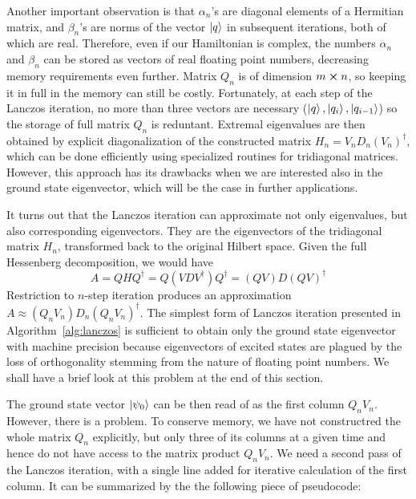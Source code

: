 Another important observation is that \(\alpha_n\)'s are diagonal elements of a Hermitian matrix, and \(\beta_n\)'s are
norms of the vector \(\ket{q}\) in subsequent iterations, both of which are real. Therefore, even if our Hamiltonian is
complex, the numbers \(\alpha_n\) and \(\beta_n\) can be stored as vectors of real floating point numbers, decreasing
memory requirements even further.
Matrix \(Q_n\) is of dimension \(m \cross n\), so keeping it in full in the memory can still be costly. Fortunately,
at each step of the Lanczos iteration, no more than three vectors are necessary (\(\ket{q},\ket{q_i},\ket{q_{i-1}}\))
so the storage of full matrix \(Q_n\) is reduntant. Extremal eigenvalues are then obtained by explicit diagonalization
of the constructed matrix \(H_n = V_n D_n (V_n)^{\dagger}\), which can be done efficiently using specialized routines
for tridiagonal matrices. However, this approach has its drawbacks when we are interested also in the ground state
eigenvector, which will be the case in further applications.

It turns out that the Lanczos iteration can approximate not only eigenvalues,
but also corresponding eigenvectors. They are the eigenvectors of the tridiagonal matrix \(H_n\), transformed back
to the original Hilbert space. Given the full Hessenberg decomposition, we would have
\begin{equation}
	A = Q H Q^{\dagger} = Q (VDV^{\dagger}) Q^{\dagger} = (QV)D(QV)^{\dagger}
	\label{eq:factorization}
\end{equation}
Restriction to \(n\)-step iteration produces an approximation \(A\approx (Q_n V_n)D_n(Q_n V_n)^{\dagger}\).
The simplest form of Lanczos iteration presented in Algorithm~\ref{alg:lanczos} is sufficient to obtain
only the ground state eigenvector with machine precision because eigenvectors of excited states are plagued
by the loss of orthogonality stemming from the nature of floating point numbers. We shall have a brief look at this problem
at the end of this section.

The ground state vector \(\ket{\psi_0}\) can be then read of as the first column \(Q_n V_n\). However, there is a problem.
To conserve memory, we have not constructred the whole matrix \(Q_n\) explicitly, but only three of its columns
at a given time and hence do not have access to the matrix product \(Q_n V_n\). We need a second pass of the Lanczos
iteration, with a single line added for iterative calculation of the first column. It can be summarized by the
the following piece of pseudocode:

